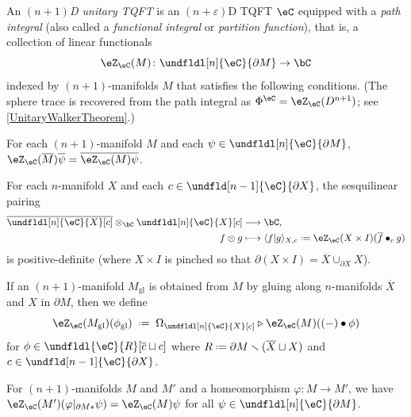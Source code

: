 \documentclass[12pt,reqno]{amsart}
\newcommand{\glu}{\mathrm{gl}}
\newcommand{\psn}{\Phi}
\newcommand{\C}{\eC}
\newcommand{\Z}{\eZ}
\newcommand{\e}{\varepsilon}
\newcommand{\bdy}{\partial}
\newcommand{\blt}{\bullet}
\newcommand{\fcj}[1]{\overline{#1}}
\newcommand{\orev}{\overline}
\newcommand{\bkt}[2]{\langle #1|#2 \rangle}
\newcommand{\defn}[1]{\emph{#1}}
\renewcommand{\setminus}{\smallsetminus}
\renewcommand{\amalg}{\sqcup}
\DeclareRobustCommand{\coloneq}{\mathrel{\vcenter{\baselineskip0.5ex\lineskiplimit0pt\hbox{\scriptsize{\upshape.}}\hbox{\scriptsize{\upshape.}}}}=}
\begin{document}
\begin{definition}
\label{defUnitaryTQFT}
An \defn{$(n+1)$D unitary TQFT} is an $(n+\e)$D TQFT $\C$ equipped with a \defn{path integral}
(also called a \defn{functional integral} or \defn{partition function}), 
that is, a collection of linear functionals
\[
\Z_\C(M)\colon \undfldl[n]{\C}{\partial M}\to\bC
\]
indexed by $(n+1)$-manifolds $M$ that satisfies the following conditions. (The sphere trace is recovered from the path integral as $\psn^\C=\Z_\C(D^{n+1})$; see \cref{UnitaryWalkerTheorem}.)
\begin{lst}[leftmargin=1.15cm]
    \item[(Rfl)]\label{Rfl} For each $(n+1)$-manifold $M$ and each $\psi\in\undfldl[n]{\C}{\partial M}$, $\Z_\C(\orev{M})\fcj{\psi}=\overline{\Z_\C(M)\psi}$.
    \item[(Pos)]\label{Pos} For each $n$-manifold $X$ and each $c\in \undfld[n-1]{\C}{\partial X}$, the sesquilinear pairing
    \begin{equation}
    \label{pair}
      \begin{aligned}
        \overline{\undfldl[n]{\C}{X}[c]}\otimes_{\bC}\undfldl[n]{\C}{X}[c] & \longrightarrow \bC,
        \\
        f\otimes g                      & \longmapsto \bkt{f}{g}_{X,c}\coloneq\Z_\C(X\times I)(\fcj f\blt_c g)
      \end{aligned}
    \end{equation}
    is positive-definite (where $X\times I$ is pinched so that $\partial (X\times I)=\orev{X}\cup_{\partial X} X$).
    \item[(Glu)]\label{Glu}
    If an $(n+1)$-manifold $M_\glu$ is obtained from $M$ by gluing along $n$-manifolds $\orev{X}$ and $X$ in $\bdy M$, then we define
      \begin{equation}\label{eq:gluing-formula}
          \Z_\C(M_\glu)(\phi_\glu)
          \;\coloneq\;
          \Omega_{\undfldl[n]{\C}{X}[c]}\triangleright\Z_\C(M)\!\left((-)\blt\phi\right)
      \end{equation}
      for $\phi\in\undfldl{\C}{R}[\fcj c\amalg c]$ where $R\coloneq\partial M\setminus(\orev X\amalg X)$ and $c\in\undfld[n-1]{\C}{\bdy X}$.
    \item[(Inv)]\label{Inv}
    For $(n+1)$-manifolds $M$ and $M'$ and a homeomorphism $\varphi\colon M\to M'$, we have $\Z_\C(M')({\varphi|_{\partial M*}}\psi)=\Z_\C(M)\psi$ for all $\psi\in\undfldl[n]{\C}{\partial M}$.
\end{lst}
\end{definition}
\end{document}

